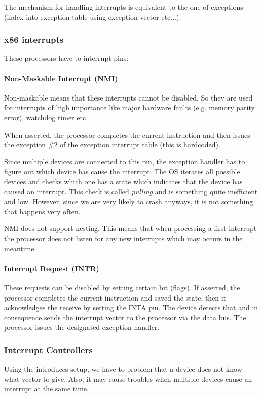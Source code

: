 The mechanism for handling interrupts is equivalent to the one of exceptions (index into exception table using exception vector etc...).

\subsubsection{x86 interrupts}
These processors have to interrupt pins:

\paragraph{Non-Maskable Interrupt (NMI)}
Non-maskable means that these interrupts cannot be disabled. So they are used for interrupts of high importance like major hardware faults (e.g. memory parity error), watchdog timer etc.

When asserted, the processor completes the current instruction and then issues the exception \#2 of the exception interrupt table (this is hardcoded).

Since multiple devices are connected to this pin, the exception handler has to figure out which device has cause the interrupt. The OS iterates all possible devices and checks which one has a state which indicates that the device has caused an interrupt. This check is called \textit{pulling} and is something quite inefficient and low. However, since we are very likely to crash anyways, it is not something that happens very often.

NMI does not support nesting. This means that when processing a first interrupt the processor does not listen for any new interrupts which may occurs in the meantime. 

\paragraph{Interrupt Request (INTR)}
These requests can be disabled by setting certain bit (flags). If asserted, the processor completes the current instruction and saved the state, then it acknowledges the receive by setting the INTA pin. The device detects that and in consequence sends the interrupt vector to the processor via the data bus. The processor issues the designated exception handler. 

\subsubsection{Interrupt Controllers}
Using the introduces setup, we have to problem that a device does not know what vector to give. Also, it may cause troubles when multiple devices cause an interrupt at the same time.

